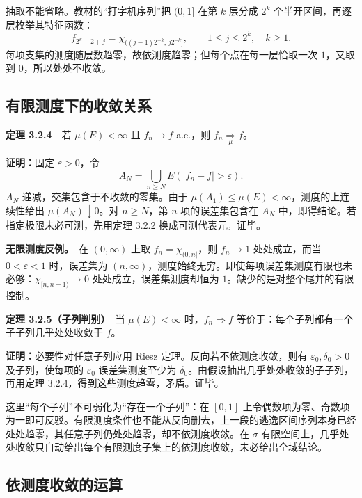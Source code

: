 \documentclass[11pt,a4paper]{article}
\begin{document}
抽取不能省略。教材的``打字机序列''把 \((0,1]\) 在第 \(k\) 层分成 \(2^k\)
个半开区间，再逐层枚举其特征函数： \[
f_{2^k-2+j}=\chi_{((j-1)2^{-k},\,j2^{-k}]},
\qquad 1\le j\le2^k,\quad k\ge1.
\] 每项支集的测度随层数趋零，故依测度趋零；但每个点在每一层恰取一次
\(1\)，又取到 \(0\)，所以处处不收敛。

\subsection*{有限测度下的收敛关系}\label{ux6709ux9650ux6d4bux5ea6ux4e0bux7684ux6536ux655bux5173ux7cfb}

\textbf{定理 3.2.4}　若 \(\mu(E)<\infty\) 且 \(f_n\to f\) a.e.，则
\(f_n\underset{\mu}{\Rightarrow}f\)。

\textbf{证明：}固定 \(\varepsilon>0\)，令 \[
A_N=\bigcup_{n\ge N}E(|f_n-f|>\varepsilon).
\] \(A_N\) 递减，交集包含于不收敛的零集。由于
\(\mu(A_1)\le\mu(E)<\infty\)，测度的上连续性给出
\(\mu(A_N)\downarrow0\)。对 \(n\ge N\)，第 \(n\) 项的误差集包含在
\(A_N\) 中，即得结论。若指定极限未必可测，先用定理 3.2.2
换成可测代表元。证毕。

\textbf{无限测度反例。}　在 \((0,\infty)\) 上取 \(f_n=\chi_{(0,n]}\)，则
\(f_n\to1\) 处处成立，而当 \(0<\varepsilon<1\) 时，误差集为
\((n,\infty)\)，测度始终无穷。即使每项误差集测度有限也未必够：\(\chi_{[n,n+1)}\to0\)
处处成立，误差集测度却恒为 \(1\)。缺少的是对整个尾并的有限控制。

\textbf{定理 3.2.5（子列判别）}　当 \(\mu(E)<\infty\)
时，\(f_n\Rightarrow f\) 等价于：每个子列都有一个子子列几乎处处收敛于
\(f\)。

\textbf{证明：}必要性对任意子列应用 Riesz 定理。反向若不依测度收敛，则有
\(\varepsilon_0,\delta_0>0\) 及子列，使每项的 \(\varepsilon_0\)
误差集测度至少为 \(\delta_0\)。由假设抽出几乎处处收敛的子子列，再用定理
3.2.4，得到这些测度趋零，矛盾。证毕。

这里``每个子列''不可弱化为``存在一个子列''：在 \([0,1]\)
上令偶数项为零、奇数项为一即可反驳。有限测度条件也不能从反向删去，上一段的逃逸区间序列本身已经处处趋零，其任意子列仍处处趋零，却不依测度收敛。在
\(\sigma\)
有限空间上，几乎处处收敛只自动给出每个有限测度子集上的依测度收敛，未必给出全域结论。

\subsection*{依测度收敛的运算}\label{ux4f9dux6d4bux5ea6ux6536ux655bux7684ux8fd0ux7b97}
\end{document}
